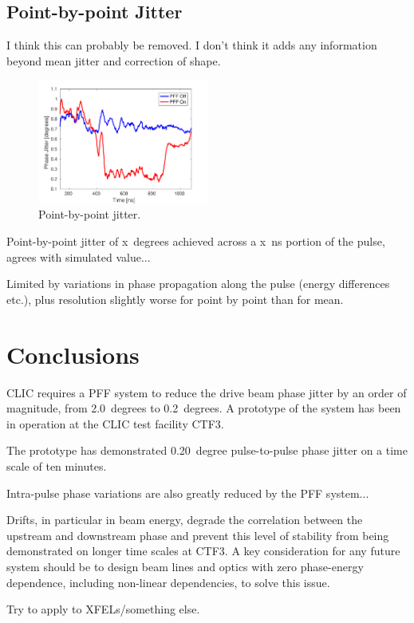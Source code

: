 \documentclass[%
 reprint,
 amsmath,amssymb,
 aps,
]{revtex4-1}
\begin{document}
\subsection{\label{ss:pbpJit}Point-by-point Jitter}

I think this can probably be removed. I don't think it adds any 
information beyond mean jitter and correction of shape.

\begin{figure}
\includegraphics[width=0.5\textwidth]{figs/BestFF_pbp}%
\caption{\label{fig:BestFF_pbp}Point-by-point jitter.}
\end{figure}


Point-by-point jitter of x~degrees achieved across a x~ns portion of the pulse, agrees with simulated value...

Limited by variations in phase propagation along the pulse (energy differences etc.), plus resolution slightly worse for point by point than for mean.



\section{\label{s:conc}Conclusions}

CLIC requires a PFF system to reduce the drive beam phase jitter by an order of 
magnitude, from 2.0~degrees to 0.2~degrees. A prototype of the system has been 
in operation at the CLIC test facility CTF3.

The prototype has demonstrated 0.20~degree pulse-to-pulse phase jitter on a 
time scale of ten minutes. 

Intra-pulse phase variations are also greatly reduced by the PFF system...

Drifts, in particular in beam energy, degrade the correlation between the 
upstream and downstream phase and prevent this level of stability from being 
demonstrated on longer time scales at CTF3. A key consideration for any future 
system should be to design beam lines and optics with zero phase-energy 
dependence, including non-linear dependencies, to solve this issue.

Try to apply to XFELs/something else.

\end{document}
